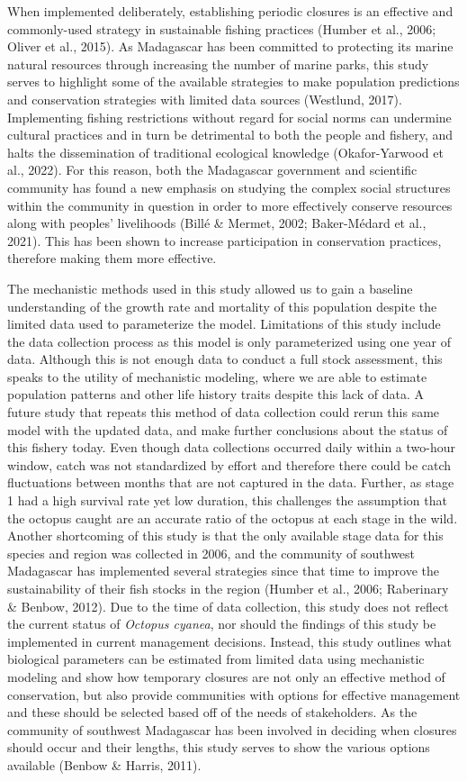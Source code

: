\documentclass[
]{article}
\begin{document}
When implemented deliberately, establishing periodic closures is an effective and commonly-used strategy in sustainable fishing practices (Humber et al., 2006; Oliver et al., 2015). As Madagascar has been committed to protecting its marine natural resources through increasing the number of marine parks, this study serves to highlight some of the available strategies to make population predictions and conservation strategies with limited data sources (Westlund, 2017). Implementing fishing restrictions without regard for social norms can undermine cultural practices and in turn be detrimental to both the people and fishery, and halts the dissemination of traditional ecological knowledge (Okafor-Yarwood et al., 2022). For this reason, both the Madagascar government and scientific community has found a new emphasis on studying the complex social structures within the community in question in order to more effectively conserve resources along with peoples' livelihoods (Billé \& Mermet, 2002; Baker-Médard et al., 2021). This has been shown to increase participation in conservation practices, therefore making them more effective.

The mechanistic methods used in this study allowed us to gain a baseline understanding of the growth rate and mortality of this population despite the limited data used to parameterize the model. Limitations of this study include the data collection process as this model is only parameterized using one year of data. Although this is not enough data to conduct a full stock assessment, this speaks to the utility of mechanistic modeling, where we are able to estimate population patterns and other life history traits despite this lack of data. A future study that repeats this method of data collection could rerun this same model with the updated data, and make further conclusions about the status of this fishery today. Even though data collections occurred daily within a two-hour window, catch was not standardized by effort and therefore there could be catch fluctuations between months that are not captured in the data. Further, as stage 1 had a high survival rate yet low duration, this challenges the assumption that the octopus caught are an accurate ratio of the octopus at each stage in the wild. Another shortcoming of this study is that the only available stage data for this species and region was collected in 2006, and the community of southwest Madagascar has implemented several strategies since that time to improve the sustainability of their fish stocks in the region (Humber et al., 2006; Raberinary \& Benbow, 2012). Due to the time of data collection, this study does not reflect the current status of \emph{Octopus cyanea}, nor should the findings of this study be implemented in current management decisions. Instead, this study outlines what biological parameters can be estimated from limited data using mechanistic modeling and show how temporary closures are not only an effective method of conservation, but also provide communities with options for effective management and these should be selected based off of the needs of stakeholders. As the community of southwest Madagascar has been involved in deciding when closures should occur and their lengths, this study serves to show the various options available (Benbow \& Harris, 2011).
\end{document}

